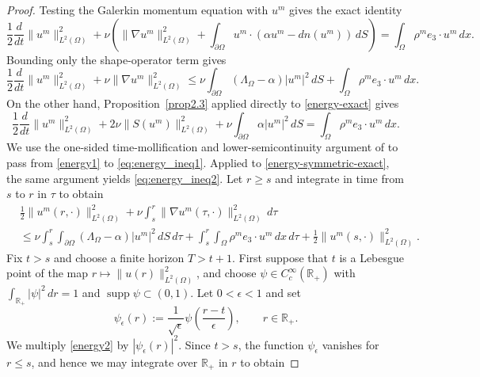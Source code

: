 \documentclass[11pt,reqno]{amsart}
\theoremstyle{plain}
\numberwithin{equation}{section}
\newcommand{\R}{\mathbb{R}}
\begin{document}
\begin{proof}
Testing the Galerkin momentum equation with $u^m$ gives the exact identity
\begin{equation}\label{energy-exact}
\frac12\frac{d}{dt}\|u^m\|_{L^2(\Omega)}^2
+\nu\left(\|\nabla u^m\|_{L^2(\Omega)}^2
+\int_{\partial\Omega}u^m\cdot(\alpha u^m-dn(u^m))\,dS\right)
=\int_\Omega\rho^m e_3\cdot u^m\,dx.
\end{equation}
Bounding only the shape-operator term gives
\begin{equation}\label{energy1}
\frac12\frac{d}{dt}\|u^m\|_{L^2(\Omega)}^2
+\nu\|\nabla u^m\|_{L^2(\Omega)}^2
\le \nu\int_{\partial\Omega}(\Lambda_\Omega-\alpha)|u^m|^2\,dS
+\int_\Omega\rho^m e_3\cdot u^m\,dx.
\end{equation}
On the other hand, Proposition~\ref{prop2.3} applied directly to \eqref{energy-exact} gives
\begin{equation}\label{energy-symmetric-exact}
\frac12\frac{d}{dt}\|u^m\|_{L^2(\Omega)}^2
+2\nu\|S(u^m)\|_{L^2(\Omega)}^2
+\nu\int_{\partial\Omega}\alpha|u^m|^2\,dS
=\int_\Omega\rho^m e_3\cdot u^m\,dx.
\end{equation}
We use the one-sided time-mollification and lower-semicontinuity
argument of \cite[Theorem~4.4]{Kelliher2025} to pass from
\eqref{energy1} to \eqref{eq:energy_ineq1}. Applied to
\eqref{energy-symmetric-exact}, the same argument yields
\eqref{eq:energy_ineq2}. Let $r\ge s$ and integrate in time from $s$ to $r$ in $\tau$ to obtain
    \begin{equation}\label{energy2}
    \begin{split}
        &\frac{1}{2}\|u^m(r,\cdot)\|^2_{L^2(\Omega)}+\nu\int_s^r\|\nabla u^m(\tau,\cdot)\|^2_{L^2(\Omega)}\,d\tau
        \\&
        \le \nu\int_s^r\int_{\partial\Omega}(\Lambda_\Omega-\alpha)|u^m|^2\,dS\,d\tau+\int_s^r\int_\Omega \rho^m e_3\cdot u^m\,dx\,d\tau
        +\frac{1}{2}\|u^m(s,\cdot)\|^2_{L^2(\Omega)}.
    \end{split}     
    \end{equation}
Fix $t>s$ and choose a finite horizon $T>t+1$. First suppose that $t$ is a Lebesgue point of the map $r\mapsto\|u(r)\|_{L^2(\Omega)}^2$, and choose $\psi\in C^\infty_c(\R_+)$ with $\int_{\R_+}|\psi|^2\,dr=1$ and $\operatorname{supp}\psi\subset(0,1)$. Let $0<\epsilon<1$ and set
    \[
    \psi_\epsilon(r):=\frac{1}{\sqrt\epsilon}\psi\left(\frac{r-t}{\epsilon}\right),
    \qquad r\in\R_+.
    \]
    We multiply \eqref{energy2} by $|\psi_\epsilon(r)|^2$. Since $t> s$, the function $\psi_\epsilon$ vanishes for $r\le s$, and hence we may integrate over $\R_+$ in $r$ to obtain

\end{proof}
\end{document}
